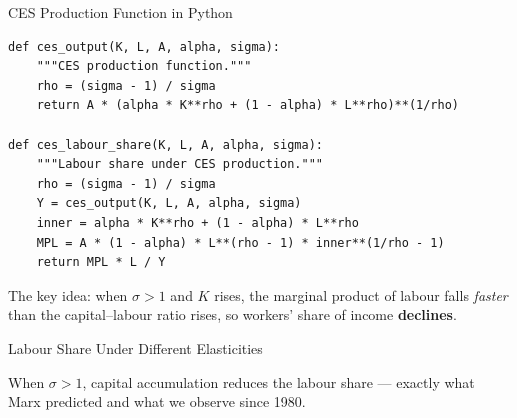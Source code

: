 \documentclass[aspectratio=169, 10pt]{beamer}
\begin{document}
\begin{frame}[fragile]{CES Production Function in Python}
\begin{lstlisting}
def ces_output(K, L, A, alpha, sigma):
    """CES production function."""
    rho = (sigma - 1) / sigma
    return A * (alpha * K**rho + (1 - alpha) * L**rho)**(1/rho)

def ces_labour_share(K, L, A, alpha, sigma):
    """Labour share under CES production."""
    rho = (sigma - 1) / sigma
    Y = ces_output(K, L, A, alpha, sigma)
    inner = alpha * K**rho + (1 - alpha) * L**rho
    MPL = A * (1 - alpha) * L**(rho - 1) * inner**(1/rho - 1)
    return MPL * L / Y
\end{lstlisting}
\vspace{0.3em}
The key idea: when $\sigma > 1$ and $K$ rises, the marginal product of
labour falls \textit{faster} than the capital--labour ratio rises,
so workers' share of income \textbf{declines}.
\end{frame}

\begin{frame}{Labour Share Under Different Elasticities}
\begin{center}
\end{center}
\vspace{0.3em}
When $\sigma > 1$, \alert{capital accumulation reduces the labour share}
--- exactly what Marx predicted and what we observe since 1980.
\end{frame}
\end{document}

